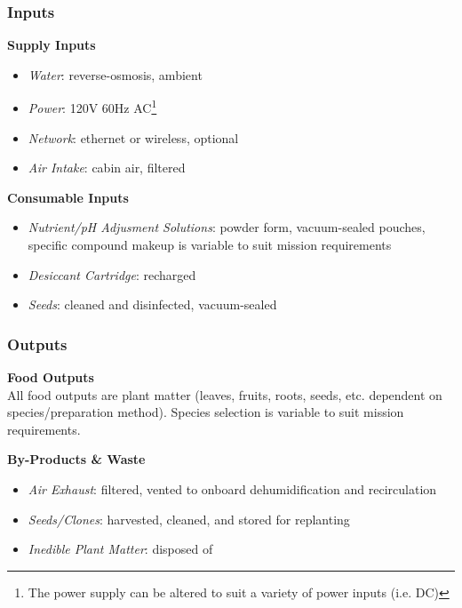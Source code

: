 \clearpage

\subsubsection{Inputs}

\textbf{Supply Inputs}
\begin{itemize}
    \item \textit{Water}: reverse-osmosis, ambient
    \item \textit{Power}: 120V 60Hz AC\footnote{The power supply can be altered to suit a variety of power inputs (i.e. DC)}
    \item \textit{Network}: ethernet or wireless, optional
    \item \textit{Air Intake}: cabin air, filtered
\end{itemize}

\textbf{Consumable Inputs}
\begin{itemize}
    \item \textit{Nutrient/pH Adjusment Solutions}: powder form, vacuum-sealed pouches, specific compound makeup is variable to suit mission requirements
    \item \textit{Desiccant Cartridge}: recharged
    \item \textit{Seeds}: cleaned and disinfected, vacuum-sealed
\end{itemize}

\subsubsection{Outputs}

\textbf{Food Outputs}\\
All food outputs are plant matter (leaves, fruits, roots, seeds, etc. dependent on species/preparation method). Species selection is variable to suit mission requirements.

\textbf{By-Products \& Waste}
\begin{itemize}
    \item \textit{Air Exhaust}: filtered, vented to onboard dehumidification and recirculation
    \item \textit{Seeds/Clones}: harvested, cleaned, and stored for replanting
    \item \textit{Inedible Plant Matter}: disposed of
\end{itemize}

